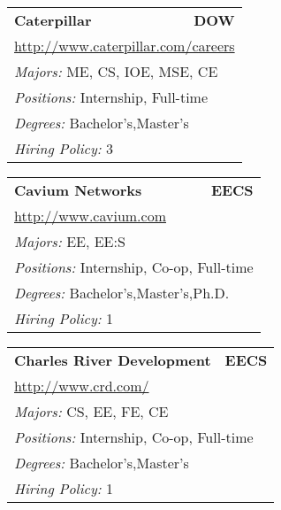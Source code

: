 \documentclass[twoside]{article}
\begin{document}
\begin{center}
\begin{multicols}{3}
\begin{FlushLeft}
\begin{minipage}{.9\columnwidth}
\end{minipage}
 
\begin{minipage}{.9\columnwidth}\begin{tabularx}{.95\columnwidth}{Xr}
                 {\Large\bf Caterpillar} & {\Large\bf DOW}\\
    \multicolumn{2}{p{.95\columnwidth}}{\url{http://www.caterpillar.com/careers}}\\
    \multicolumn{2}{p{.95\columnwidth}}{\emph{Majors:} ME, CS, IOE, MSE, CE}\\
    \multicolumn{2}{p{.95\columnwidth}}{\emph{Positions:} Internship, Full-time}\\
    \multicolumn{2}{p{.95\columnwidth}}{\emph{Degrees:} Bachelor's,Master's}\\
    \multicolumn{2}{p{.95\columnwidth}}{\emph{Hiring Policy:} 3}\\
    \end{tabularx}
    
\end{minipage}
 
\begin{minipage}{.9\columnwidth}\begin{tabularx}{.95\columnwidth}{Xr}
                 {\Large\bf Cavium Networks} & {\Large\bf EECS}\\
    \multicolumn{2}{p{.95\columnwidth}}{\url{http://www.cavium.com}}\\
    \multicolumn{2}{p{.95\columnwidth}}{\emph{Majors:} EE, EE:S}\\
    \multicolumn{2}{p{.95\columnwidth}}{\emph{Positions:} Internship, Co-op, Full-time}\\
    \multicolumn{2}{p{.95\columnwidth}}{\emph{Degrees:} Bachelor's,Master's,Ph.D.}\\
    \multicolumn{2}{p{.95\columnwidth}}{\emph{Hiring Policy:} 1}\\
    \end{tabularx}
    
\end{minipage}
 
\begin{minipage}{.9\columnwidth}\begin{tabularx}{.95\columnwidth}{Xr}
                 {\Large\bf Charles River Development} & {\Large\bf EECS}\\
    \multicolumn{2}{p{.95\columnwidth}}{\url{http://www.crd.com/}}\\
    \multicolumn{2}{p{.95\columnwidth}}{\emph{Majors:} CS, EE, FE, CE}\\
    \multicolumn{2}{p{.95\columnwidth}}{\emph{Positions:} Internship, Co-op, Full-time}\\
    \multicolumn{2}{p{.95\columnwidth}}{\emph{Degrees:} Bachelor's,Master's}\\
    \multicolumn{2}{p{.95\columnwidth}}{\emph{Hiring Policy:} 1}\\
    \end{tabularx}
    

\end{minipage}
\end{FlushLeft}
\end{multicols}
\end{center}
\end{document}
